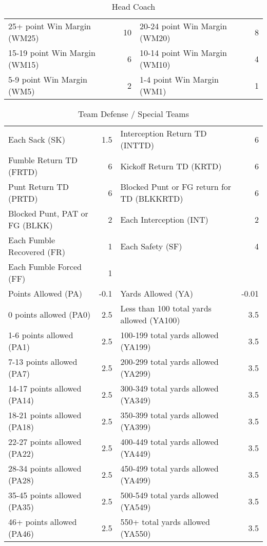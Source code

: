 \documentclass{article}
\begin{document}
    \begin{table}[h]
        \caption{Head Coach}
        \begin{tabular}{lr|lr}
            \hline
            25+ point Win Margin (WM25) & 10 & 20-24 point Win Margin (WM20) & 8\\
            15-19 point Win Margin (WM15) & 6 & 10-14 point Win Margin (WM10) & 4\\
            5-9 point Win Margin (WM5) & 2 & 1-4 point Win Margin (WM1) & 1\\
            \hline
        \end{tabular}
    \end{table}
    \begin{table}[H]
        \caption{Team Defense / Special Teams}
        \centering
        \begin{tabular}{lr|lr}
            \hline
            Each Sack (SK) & 1.5 & Interception Return TD (INTTD) & 6\\
            Fumble Return TD (FRTD) & 6 & Kickoff Return TD (KRTD) & 6\\
            Punt Return TD (PRTD) & 6 & Blocked Punt or FG return for TD (BLKKRTD) & 6\\
            Blocked Punt, PAT or FG (BLKK) & 2 & Each Interception (INT) & 2\\
            Each Fumble Recovered (FR) & 1 & Each Safety (SF) & 4\\
            Each Fumble Forced (FF) & 1\\
            Points Allowed (PA) & -0.1 & Yards Allowed (YA) & -0.01\\
            0 points allowed (PA0) & 2.5 & Less than 100 total yards allowed (YA100) & 3.5 \\
            1-6 points allowed (PA1) & 2.5 & 100-199 total yards allowed (YA199) & 3.5\\
            7-13 points allowed (PA7) & 2.5 & 200-299 total yards allowed (YA299) & 3.5\\
            14-17 points allowed (PA14) & 2.5 & 300-349 total yards allowed (YA349) & 3.5\\
            18-21 points allowed (PA18) & 2.5 & 350-399 total yards allowed (YA399) & 3.5\\
            22-27 points allowed (PA22) & 2.5 & 400-449 total yards allowed (YA449) & 3.5\\
            28-34 points allowed (PA28) & 2.5 & 450-499 total yards allowed (YA499) & 3.5\\
            35-45 points allowed (PA35) & 2.5 & 500-549 total yards allowed (YA549) & 3.5\\
            46+ points allowed (PA46) & 2.5 & 550+ total yards allowed (YA550) & 3.5\\
            \hline
        \end{tabular}
    \end{table}
\end{document}
